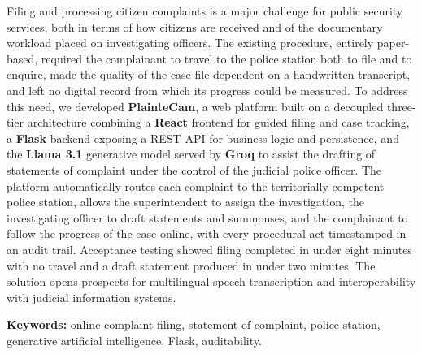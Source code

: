 \documentclass[12pt,a4paper,oneside]{extbook}
\begin{document}
Filing and processing citizen complaints is a major challenge for public security services, both in terms of how citizens are received and of the documentary workload placed on investigating officers. The existing procedure, entirely paper-based, required the complainant to travel to the police station both to file and to enquire, made the quality of the case file dependent on a handwritten transcript, and left no digital record from which its progress could be measured. To address this need, we developed \textbf{PlainteCam}, a web platform built on a decoupled three-tier architecture combining a \textbf{React} frontend for guided filing and case tracking, a \textbf{Flask} backend exposing a REST API for business logic and persistence, and the \textbf{Llama 3.1} generative model served by \textbf{Groq} to assist the drafting of statements of complaint under the control of the judicial police officer. The platform automatically routes each complaint to the territorially competent police station, allows the superintendent to assign the investigation, the investigating officer to draft statements and summonses, and the complainant to follow the progress of the case online, with every procedural act timestamped in an audit trail. Acceptance testing showed filing completed in under eight minutes with no travel and a draft statement produced in under two minutes. The solution opens prospects for multilingual speech transcription and interoperability with judicial information systems.

\vspace{0.4cm}
\noindent\textbf{Keywords:} online complaint filing, statement of complaint, police station, generative artificial intelligence, Flask, auditability.

\renewcommand{\contentsname}{Sommaire}
\tableofcontents

\newpage
\listoftables
\renewcommand{\listfigurename}{Liste des figures}
\listoffigures

\end{document}
